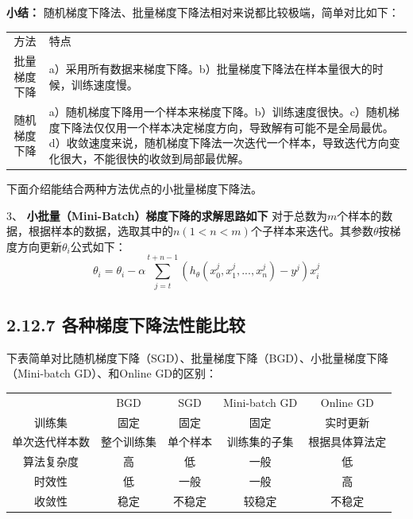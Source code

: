 \textbf{小结：}
随机梯度下降法、批量梯度下降法相对来说都比较极端，简单对比如下：

\begin{longtable}[]{ cl }
\begin{minipage}[b]{0.17\columnwidth}\centering\strut
方法\strut
\end{minipage} & \begin{minipage}[b]{0.78\columnwidth}\raggedright\strut
特点\strut
\end{minipage}\tabularnewline
\begin{minipage}[t]{0.17\columnwidth}\centering\strut
批量梯度下降\strut
\end{minipage} & \begin{minipage}[t]{0.78\columnwidth}\raggedright\strut
a）采用所有数据来梯度下降。b）批量梯度下降法在样本量很大的时候，训练速度慢。\strut
\end{minipage}\tabularnewline
\begin{minipage}[t]{0.17\columnwidth}\centering\strut
随机梯度下降\strut
\end{minipage} & \begin{minipage}[t]{0.78\columnwidth}\raggedright\strut
a）随机梯度下降用一个样本来梯度下降。b）训练速度很快。c）随机梯度下降法仅仅用一个样本决定梯度方向，导致解有可能不是全局最优。d）收敛速度来说，随机梯度下降法一次迭代一个样本，导致迭代方向变化很大，不能很快的收敛到局部最优解。\strut
\end{minipage}\tabularnewline
\end{longtable}

下面介绍能结合两种方法优点的小批量梯度下降法。

3、 \textbf{小批量（Mini-Batch）梯度下降的求解思路如下}
对于总数为$m$个样本的数据，根据样本的数据，选取其中的$n(1< n< m)$个子样本来迭代。其参数$\theta$按梯度方向更新$\theta_i$公式如下：
\[
\theta_i = \theta_i - \alpha \sum^{t+n-1}_{j=t}
        ( h_\theta (x^{j}_{0}, x^{j}_{1}, ... , x^{j}_{n} ) - y^j ) x^{j}_{i}
\]

\subsection{2.12.7
各种梯度下降法性能比较}\label{ux5404ux79cdux68afux5ea6ux4e0bux964dux6cd5ux6027ux80fdux6bd4ux8f83}

​
下表简单对比随机梯度下降（SGD）、批量梯度下降（BGD）、小批量梯度下降（Mini-batch
GD）、和Online GD的区别：

\begin{longtable}[]{ ccccc }
& BGD & SGD & Mini-batch GD & Online GD\tabularnewline
训练集 & 固定 & 固定 & 固定 & 实时更新\tabularnewline
单次迭代样本数 & 整个训练集 & 单个样本 & 训练集的子集 &
根据具体算法定\tabularnewline
算法复杂度 & 高 & 低 & 一般 & 低\tabularnewline
时效性 & 低 & 一般 & 一般 & 高\tabularnewline
收敛性 & 稳定 & 不稳定 & 较稳定 & 不稳定\tabularnewline
\end{longtable}

